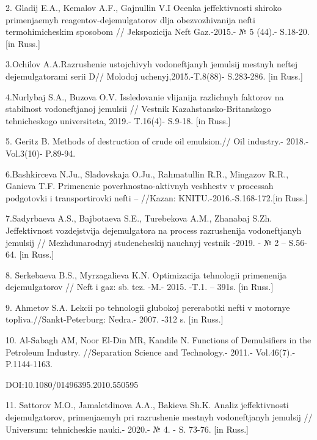 2. Gladij E.A., Kemalov A.F., Gajnullin V.I Ocenka jeffektivnosti
shiroko primenjaemyh reagentov-dejemul\textquotesingle gatorov dlja
obezvozhivanija nefti termohimicheskim sposobom // Jekspozicija
Neft\textquotesingle{} Gaz.-2015.- № 5 (44).- S.18-20. {[}in Russ.{]}

3.Ochilov A.A.Razrushenie ustojchivyh vodoneftjanyh
jemul\textquotesingle sij mestnyh neftej
dejemul\textquotesingle gatorami serii D// Molodoj
uchenyj,2015.-T.8(88)- S.283-286. {[}in Russ.{]}

4.Nurlybaj S.A., Buzova O.V. Issledovanie vlijanija razlichnyh faktorov
na stabil\textquotesingle nost\textquotesingle{} vodoneftjanoj
jemul\textquotesingle sii // Vestnik Kazahstansko-Britanskogo
tehnicheskogo universiteta, 2019.- T.16(4)- S.9-18. {[}in Russ.{]}

5. Geritz B. Methods of destruction of crude oil emulsion.// Oil
industry.- 2018.- Vol.3(10)- P.89-94.

6.Bashkirceva N.Ju., Sladovskaja O.Ju., Rahmatullin R.R., Mingazov R.R.,
Ganieva T.F. Primenenie poverhnostno-aktivnyh veshhestv v processah
podgotovki i transportirovki nefti -- //Kazan\textquotesingle:
KNITU.-2016.-S.168-172.{[}in Russ.{]}

7.Sadyrbaeva A.S., Bajbotaeva S.E., Turebekova A.M., Zhanabaj S.Zh.
Jeffektivnost\textquotesingle{} vozdejstvija
dejemul\textquotesingle gatora na process razrushenija vodoneftjanyh
jemul\textquotesingle sij // Mezhdunarodnyj studencheskij nauchnyj
vestnik -2019. - № 2 -- S.56-64. {[}in Russ.{]}

8. Serkebaeva B.S., Myrzagalieva K.N. Optimizacija tehnologii
primenenija dejemul\textquotesingle gatorov // Neft\textquotesingle{} i
gaz: sb. tez. -M.- 2015. -T.1. -- 391s. {[}in Russ.{]}

9. Ahmetov S.A. Lekcii po tehnologii glubokoj pererabotki nefti v
motornye topliva.//Sankt-Peterburg: Nedra.- 2007. -312 s. {[}in Russ.{]}

10. Al-Sabagh AM, Noor El-Din MR, Kandile N. Functions of Demulsifiers
in the Petroleum Industry. //Separation Science and Technology.- 2011.-
Vol.46(7).- P.1144-1163.

DOI:10.1080/01496395.2010.550595

11. Sattorov M.O., Jamaletdinova A.A., Bakieva Sh.K. Analiz
jeffektivnosti dejemul\textquotesingle gatorov, primenjaemyh pri
razrushenie mestnyh vodoneftjanyh jemul\textquotesingle sij //
Universum: tehnicheskie nauki.- 2020.- № 4. - S. 73-76. {[}in Russ.{]}

